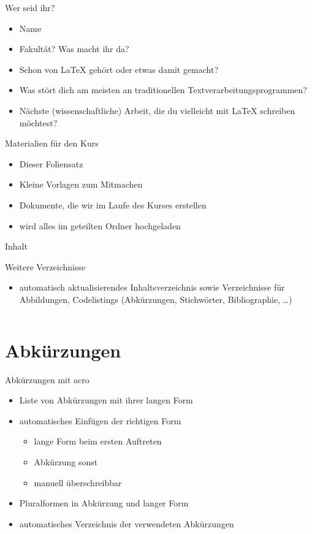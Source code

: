 \documentclass[presentation,aspectratio=169]{beamer}
\begin{document}

\begin{frame}{Wer seid ihr?}
  \begin{itemize}
    \item Name
    \item Fakultät? Was macht ihr da?
    \item Schon von \LaTeX{} gehört oder etwas damit gemacht?
    \item Was stört dich am meisten an traditionellen Textverarbeitungsprogrammen?
    \item Nächste (wissenschaftliche) Arbeit, die du vielleicht mit \LaTeX{} schreiben möchtest?
  \end{itemize}
\end{frame}

\begin{frame}{Materialien für den Kurs}
  \begin{itemize}
    \item Dieser Foliensatz
    \item Kleine Vorlagen zum Mitmachen
    \item Dokumente, die wir im Laufe des Kurses erstellen
      \bigskip
    \item wird alles im geteilten Ordner hochgeladen
  \end{itemize}
\end{frame}

\begin{frame}{Inhalt}
  \tableofcontents
\end{frame}

\begin{frame}[fragile]{Weitere Verzeichnisse}
  \begin{itemize}
    \item automatisch aktualisierendes Inhaltsverzeichnis sowie Verzeichnisse für Abbildungen, Codelistings (Abkürzungen, Stichwörter, Bibliographie, \dots)
  \end{itemize}
  \inputminted{latex}{codebeispiele/list-of-everything.tex}
\end{frame}

\section{Abkürzungen}

\begin{frame}{Abkürzungen mit acro}
  \begin{itemize}
    \item Liste von Abkürzungen mit ihrer langen Form
    \item automatisches Einfügen der richtigen Form
      \begin{itemize}
        \item lange Form beim ersten Auftreten
        \item Abkürzung sonst
        \item manuell überschreibbar
      \end{itemize}
    \item Pluralformen in Abkürzung und langer Form
    \item automatisches Verzeichnis der verwendeten Abkürzungen
  \end{itemize}
\end{frame}
\end{document}
